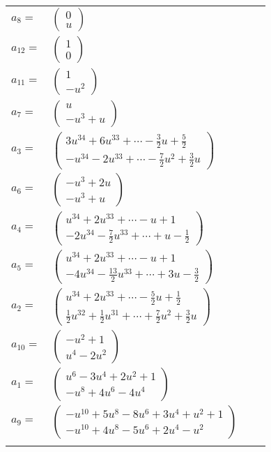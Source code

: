 \documentclass[1p]{elsarticle_modified}
\theoremstyle{definition}
\begin{document}
\begin{tabular}{m{7pt} m{180pt} m{7pt} m{180pt} }
\flushright $a_{8}=$&$\begin{pmatrix}0\\u\end{pmatrix}$ \\
\flushright $a_{12}=$&$\begin{pmatrix}1\\0\end{pmatrix}$ \\
\flushright $a_{11}=$&$\begin{pmatrix}1\\- u^2\end{pmatrix}$ \\
\flushright $a_{7}=$&$\begin{pmatrix}u\\- u^3+u\end{pmatrix}$ \\
\flushright $a_{3}=$&$\begin{pmatrix}3 u^{34}+6 u^{33}+\cdots-\frac{3}{2} u+\frac{5}{2}\\- u^{34}-2 u^{33}+\cdots-\frac{7}{2} u^2+\frac{3}{2} u\end{pmatrix}$ \\
\flushright $a_{6}=$&$\begin{pmatrix}- u^3+2 u\\- u^3+u\end{pmatrix}$ \\
\flushright $a_{4}=$&$\begin{pmatrix}u^{34}+2 u^{33}+\cdots- u+1\\-2 u^{34}-\frac{7}{2} u^{33}+\cdots+u-\frac{1}{2}\end{pmatrix}$ \\
\flushright $a_{5}=$&$\begin{pmatrix}u^{34}+2 u^{33}+\cdots- u+1\\-4 u^{34}-\frac{13}{2} u^{33}+\cdots+3 u-\frac{3}{2}\end{pmatrix}$ \\
\flushright $a_{2}=$&$\begin{pmatrix}u^{34}+2 u^{33}+\cdots-\frac{5}{2} u+\frac{1}{2}\\\frac{1}{2} u^{32}+\frac{1}{2} u^{31}+\cdots+\frac{7}{2} u^2+\frac{3}{2} u\end{pmatrix}$ \\
\flushright $a_{10}=$&$\begin{pmatrix}- u^2+1\\u^4-2 u^2\end{pmatrix}$ \\
\flushright $a_{1}=$&$\begin{pmatrix}u^6-3 u^4+2 u^2+1\\- u^8+4 u^6-4 u^4\end{pmatrix}$ \\
\flushright $a_{9}=$&$\begin{pmatrix}- u^{10}+5 u^8-8 u^6+3 u^4+u^2+1\\- u^{10}+4 u^8-5 u^6+2 u^4- u^2\end{pmatrix}$\\&\end{tabular}
\end{document}
